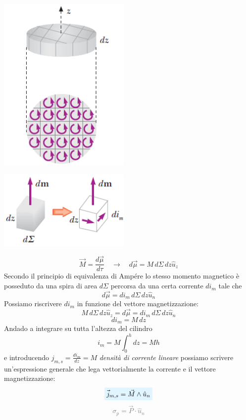 \documentclass[x11names]{report}
\newcommand{\viola}[1]{%
	\colorbox{myblue}{$\displaystyle #1$}
}
\begin{document}
\begin{minipage}{0.33\textwidth}
	\begin{center}
		\includegraphics[scale=0.5]{img/materia_2.png}
	\end{center}
\end{minipage}
\begin{minipage}{0.33\textwidth}
	\begin{center}
		\includegraphics[scale=0.5]{img/materia_3.png}
	\end{center}
\end{minipage}
\vspace{0.5cm}
\[
\vec{M} = \frac{d\vec{\mu}}{d\tau} \quad \to \quad d\vec{\mu} = M \, d\Sigma \, dz \hat{u}_z
\]
Secondo il principio di equivalenza di Ampére lo stesso momento magnetico è posseduto da una spira di area \(d\Sigma\) percorsa da una certa corrente \(di_m\) tale che 
\[
d\vec{\mu} = di_m \, d\Sigma \, dz \hat{u}_n 
\]
Possiamo riscrivere \(di_m\) in funzione del vettore magnetizzazione:
\[
M \, d\Sigma \, dz \hat{u}_z=d\vec{\mu} = di_m \, d\Sigma \, dz \hat{u}_n 
\]
\[
di_m = M \, dz
\]
Andado a integrare su tutta l'altezza del cilindro
\[
i_m = M \int_{0}^{h} dz = Mh
\]
e introducendo \(j_{m,s} = \frac{di_m}{dz} = M\) \textit{densità di corrente lineare} possiamo scrivere un'espressione generale che lega vettorialmente la corrente e il vettore magnetizzazione:
\begin{equation}
	\viola{\vec{j}_{m,s} = \vec{M}\wedge\hat{u}_n} 
\end{equation}
\vspace{-0.4cm}
 \textcolor{gray}{\[
\sigma_p = \vec{P}\cdot\hat{u}_n
\]}
\end{document}
